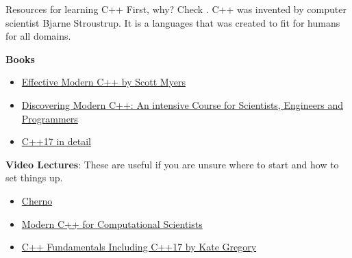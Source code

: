 \documentclass[xcolor=dvipsnames]{beamer}
\begin{document}
\begin{frame}{Resources for learning C++}
First, why? Check \href{https://medium.com/@vardanator/why-cs-students-must-learn-c-as-their-main-programming-language-6d3b4f8720bd}{}. C++ was invented by computer scientist Bjarne Stroustrup. It is a languages that was created to fit for humans for all domains. 

\textbf{Books}
\begin{itemize}
	\item \href{https://www.youtube.com/watch?v=fhM24zs1MFA}{Effective Modern C++ by Scott Myers}
	\item \href{https://www.amazon.ca/Discovering-Modern-Intensive-Scientists-Programmers/dp/0134383583}{Discovering Modern C++: An intensive Course for Scientists, Engineers and Programmers}
	\item \href{https://www.amazon.ca/17-Detail-Exciting-Features-Standard/dp/1798834065}{C++17 in detail}
\end{itemize}

\textbf{Video Lectures}: These are useful if you are unsure where to start and how to set things up.
\begin{itemize}
	\item \href{https://www.youtube.com/watch?v=1OsGXuNA5cc}{Cherno}
	\item \href{https://www.youtube.com/watch?v=0NsRloi4xd4&list=PL1zrw-_IdRMvaZVcmniINKcdQpFW-k_kC}{Modern C++ for Computational Scientists}
	\item \href{https://app.pluralsight.com/library/courses/cplusplus-fundamentals-c17/table-of-contents}{C++ Fundamentals Including C++17 by Kate Gregory}
\end{itemize}
	
\end{frame}
\end{document}
